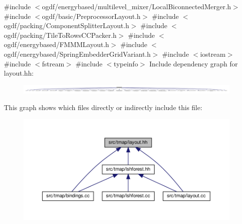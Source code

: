 {\ttfamily \#include $<$ogdf/energybased/multilevel\+\_\+mixer/\+Local\+Biconnected\+Merger.\+h$>$}\newline
{\ttfamily \#include $<$ogdf/basic/\+Preprocessor\+Layout.\+h$>$}\newline
{\ttfamily \#include $<$ogdf/packing/\+Component\+Splitter\+Layout.\+h$>$}\newline
{\ttfamily \#include $<$ogdf/packing/\+Tile\+To\+Rows\+C\+C\+Packer.\+h$>$}\newline
{\ttfamily \#include $<$ogdf/energybased/\+F\+M\+M\+M\+Layout.\+h$>$}\newline
{\ttfamily \#include $<$ogdf/energybased/\+Spring\+Embedder\+Grid\+Variant.\+h$>$}\newline
{\ttfamily \#include $<$iostream$>$}\newline
{\ttfamily \#include $<$fstream$>$}\newline
{\ttfamily \#include $<$typeinfo$>$}\newline
Include dependency graph for layout.\+hh\+:\nopagebreak
\begin{figure}[H]
\begin{center}
\leavevmode
\includegraphics[width=350pt]{layout_8hh__incl}
\end{center}
\end{figure}
This graph shows which files directly or indirectly include this file\+:\nopagebreak
\begin{figure}[H]
\begin{center}
\leavevmode
\includegraphics[width=350pt]{layout_8hh__dep__incl}
\end{center}
\end{figure}

